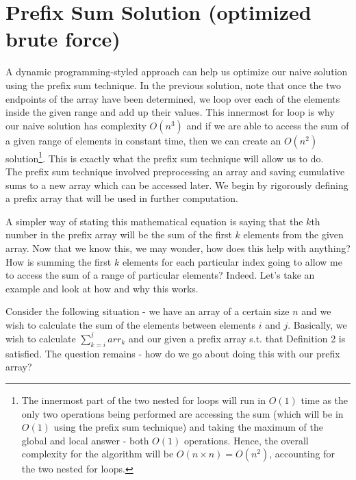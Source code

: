 
\section{Prefix Sum Solution (optimized brute force)}
A dynamic programming-styled approach can help us optimize our naive solution using the prefix sum technique. In the previous solution, note that once the two endpoints of the array have been determined, we loop over each of the elements inside the given range and add up their values. This innermost for loop is why our naive solution has complexity $O(n^3)$ and if we are able to access the sum of a given range of elements in constant time, then we can create an $O(n^2)$ solution\footnote{The innermost part of the two nested for loops will run in $O(1)$ time as the only two operations being performed are accessing the sum (which will be in $O(1)$ using the prefix sum technique) and taking the maximum of the global and local answer - both $O(1)$ operations. Hence, the overall complexity for the algorithm will be $O(n \times n) = O(n^2)$, accounting for the two nested for loops.}. This is exactly what the prefix sum technique will allow us to do. \\

\noindent The prefix sum technique involved preprocessing an array and saving cumulative sums to a new array which can be accessed later. We begin by rigorously defining a prefix array that will be used in further computation.  

\noindent \newline {}

\noindent \newline A simpler way of stating this mathematical equation is saying that the $k$th number in the prefix array will be the sum of the first $k$ elements from the given array. Now that we know this, we may wonder, how does this help with anything? How is summing the first $k$ elements for each particular index going to allow me to access the sum of a range of particular elements? Indeed. Let's take an example and look at how and why this works. \newline

\noindent Consider the following situation - we have an array of a certain size $n$ and we wish to calculate the sum of the elements between elements $i$ and $j$. Basically, we wish to calculate  $\sum_{k=i}^j arr_k$ \noindent and our given a prefix array s.t. that Definition 2 is satisfied. The question remains - how do we go about doing this with our prefix array?

